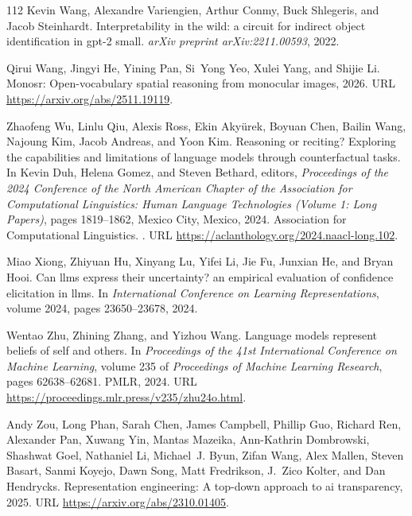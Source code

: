 \begin{thebibliography}{112}
Kevin Wang, Alexandre Variengien, Arthur Conmy, Buck Shlegeris, and Jacob Steinhardt.
\newblock Interpretability in the wild: a circuit for indirect object identification in gpt-2 small.
\newblock \emph{arXiv preprint arXiv:2211.00593}, 2022.

Qirui Wang, Jingyi He, Yining Pan, Si~Yong Yeo, Xulei Yang, and Shijie Li.
\newblock Monosr: Open-vocabulary spatial reasoning from monocular images, 2026.
\newblock URL \url{https://arxiv.org/abs/2511.19119}.

Zhaofeng Wu, Linlu Qiu, Alexis Ross, Ekin Aky{\"u}rek, Boyuan Chen, Bailin Wang, Najoung Kim, Jacob Andreas, and Yoon Kim.
\newblock Reasoning or reciting? {E}xploring the capabilities and limitations of language models through counterfactual tasks.
\newblock In Kevin Duh, Helena Gomez, and Steven Bethard, editors, \emph{Proceedings of the 2024 Conference of the North American Chapter of the Association for Computational Linguistics: Human Language Technologies (Volume 1: Long Papers)}, pages 1819--1862, Mexico City, Mexico, 2024. Association for Computational Linguistics.
\newblock {}.
\newblock URL \url{https://aclanthology.org/2024.naacl-long.102}.

Miao Xiong, Zhiyuan Hu, Xinyang Lu, Yifei Li, Jie Fu, Junxian He, and Bryan Hooi.
\newblock Can llms express their uncertainty? an empirical evaluation of confidence elicitation in llms.
\newblock In \emph{International Conference on Learning Representations}, volume 2024, pages 23650--23678, 2024.

Wentao Zhu, Zhining Zhang, and Yizhou Wang.
\newblock Language models represent beliefs of self and others.
\newblock In \emph{Proceedings of the 41st International Conference on Machine Learning}, volume 235 of \emph{Proceedings of Machine Learning Research}, pages 62638--62681. PMLR, 2024.
\newblock URL \url{https://proceedings.mlr.press/v235/zhu24o.html}.

Andy Zou, Long Phan, Sarah Chen, James Campbell, Phillip Guo, Richard Ren, Alexander Pan, Xuwang Yin, Mantas Mazeika, Ann-Kathrin Dombrowski, Shashwat Goel, Nathaniel Li, Michael~J. Byun, Zifan Wang, Alex Mallen, Steven Basart, Sanmi Koyejo, Dawn Song, Matt Fredrikson, J.~Zico Kolter, and Dan Hendrycks.
\newblock Representation engineering: A top-down approach to ai transparency, 2025.
\newblock URL \url{https://arxiv.org/abs/2310.01405}.

\end{thebibliography}
